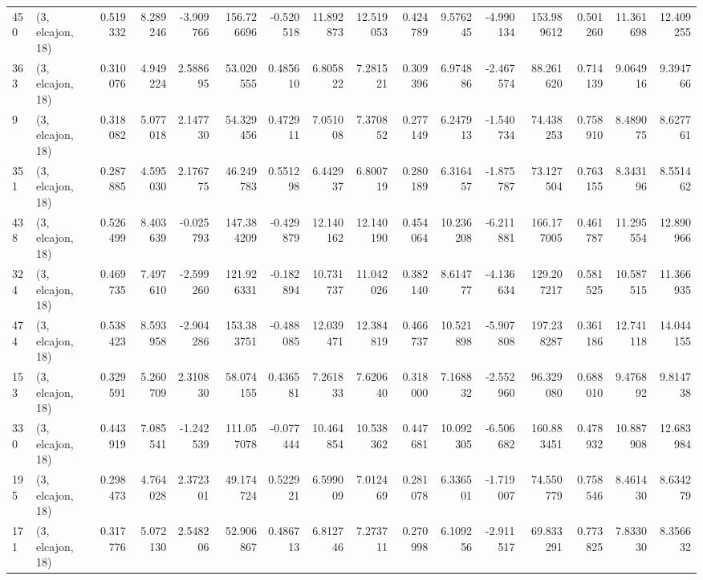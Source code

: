 \begin{tabular}{llrrrrrrrrrrrrrr}
450 &  (3, elcajon, 18) &   0.519332 &   8.289246 &  -3.909766 &   156.726696 &  -0.520518 &  11.892873 &  12.519053 &  0.424789 &   9.576245 &  -4.990134 &   153.989612 &  0.501260 &  11.361698 &  12.409255 \\
363 &  (3, elcajon, 18) &   0.310076 &   4.949224 &   2.588695 &    53.020555 &   0.485610 &   6.805822 &   7.281521 &  0.309396 &   6.974886 &  -2.467574 &    88.261620 &  0.714139 &   9.064916 &   9.394766 \\
9   &  (3, elcajon, 18) &   0.318082 &   5.077018 &   2.147730 &    54.329456 &   0.472911 &   7.051008 &   7.370852 &  0.277149 &   6.247913 &  -1.540734 &    74.438253 &  0.758910 &   8.489075 &   8.627761 \\
351 &  (3, elcajon, 18) &   0.287885 &   4.595030 &   2.176775 &    46.249783 &   0.551298 &   6.442937 &   6.800719 &  0.280189 &   6.316457 &  -1.875787 &    73.127504 &  0.763155 &   8.343196 &   8.551462 \\
438 &  (3, elcajon, 18) &   0.526499 &   8.403639 &  -0.025793 &   147.384209 &  -0.429879 &  12.140162 &  12.140190 &  0.454064 &  10.236208 &  -6.211881 &   166.177005 &  0.461787 &  11.295554 &  12.890966 \\
324 &  (3, elcajon, 18) &   0.469735 &   7.497610 &  -2.599260 &   121.926331 &  -0.182894 &  10.731737 &  11.042026 &  0.382140 &   8.614777 &  -4.136634 &   129.207217 &  0.581525 &  10.587515 &  11.366935 \\
474 &  (3, elcajon, 18) &   0.538423 &   8.593958 &  -2.904286 &   153.383751 &  -0.488085 &  12.039471 &  12.384819 &  0.466737 &  10.521898 &  -5.907808 &   197.238287 &  0.361186 &  12.741118 &  14.044155 \\
153 &  (3, elcajon, 18) &   0.329591 &   5.260709 &   2.310830 &    58.074155 &   0.436581 &   7.261833 &   7.620640 &  0.318000 &   7.168832 &  -2.552960 &    96.329080 &  0.688010 &   9.476892 &   9.814738 \\
330 &  (3, elcajon, 18) &   0.443919 &   7.085541 &  -1.242539 &   111.057078 &  -0.077444 &  10.464854 &  10.538362 &  0.447681 &  10.092305 &  -6.506682 &   160.883451 &  0.478932 &  10.887908 &  12.683984 \\
195 &  (3, elcajon, 18) &   0.298473 &   4.764028 &   2.372301 &    49.174724 &   0.522921 &   6.599009 &   7.012469 &  0.281078 &   6.336501 &  -1.719007 &    74.550779 &  0.758546 &   8.461430 &   8.634279 \\
171 &  (3, elcajon, 18) &   0.317776 &   5.072130 &   2.548206 &    52.906867 &   0.486713 &   6.812746 &   7.273711 &  0.270998 &   6.109256 &  -2.911517 &    69.833291 &  0.773825 &   7.833030 &   8.356632 \\

\end{tabular}
